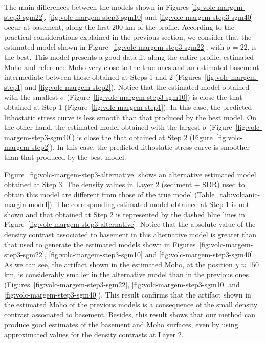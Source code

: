 \documentclass[manuscript]{geophysics}
\begin{document}
The main differences between the models shown in 
Figures \ref{fig:volc-margem-step3-sgm22}, \ref{fig:volc-margem-step3-sgm10} and 
\ref{fig:volc-margem-step3-sgm40} occur at basement,
along the first $200$ km of the profile.
According to the practical considerations explained in the previous section, 
we consider that the estimated model shown in Figure~\ref{fig:volc-margem-step3-sgm22},
with $\sigma = 22$, is the best. 
This model presents a good data fit along the entire profile, estimated Moho and
reference Moho very close to the true ones and an estimated basement intermediate
between those obtained at Steps 1 and 2 (Figures~\ref{fig:volc-margem-step1} and
\ref{fig:volc-margem-step2}).
Notice that the estimated model obtained with 
the smallest $\sigma$ (Figure~\ref{fig:volc-margem-step3-sgm10}) is close the that 
obtained at Step 1 (Figure~\ref{fig:volc-margem-step1}).
In this case, the predicted lithostatic stress curve is less smooth than that
produced by the best model.
On the other hand, the estimated model obtained with 
the largest $\sigma$ (Figure~\ref{fig:volc-margem-step3-sgm40}) is close the that 
obtained at Step 2 (Figure~\ref{fig:volc-margem-step2}).
In this case, the predicted lithostatic stress curve is smoother than that
produced by the best model.

Figure~\ref{fig:volc-margem-step3-alternative} shows an alternative 
estimated model obtained at Step 3.
The density values in Layer 2 (sediment + SDR) used to obtain this model 
are different from those of the true model (Table~\ref{tab:volcanic-margin-model}).
The corresponding estimated model obtained at Step 1 is not shown and
that obtained at Step 2 is represented by the dashed blue lines in
Figure~\ref{fig:volc-margem-step3-alternative}.
Notice that the absolute value of the density contrast associated to basement 
in this alternative model is greater than that used to generate the estimated models shown in 
Figures~\ref{fig:volc-margem-step3-sgm22}, \ref{fig:volc-margem-step3-sgm10} and
\ref{fig:volc-margem-step3-sgm40}. As we can see, the artifact shown in the estimated Moho,
at the position $y \approx 150$ km, is considerably smaller in the alternative model than
in the previous ones (Figures~\ref{fig:volc-margem-step3-sgm22}, \ref{fig:volc-margem-step3-sgm10} and
\ref{fig:volc-margem-step3-sgm40}). This result confirms that the artifact shown in the
estimated Moho of the previous models is a consequence of the small density contrast
associated to basement.
Besides, this result shows that our method can produce good estimates of the basement and
Moho surfaces, even by using approximated values for the density contrasts at Layer 2.
\end{document}
